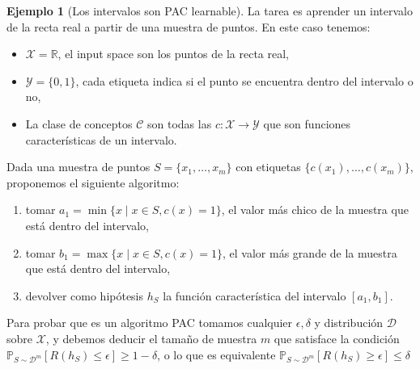 \documentclass{article}
\theoremstyle{definition}
\newtheorem{example}{Ejemplo}%
\begin{document}
\begin{example}[Los intervalos son PAC learnable] 

    La tarea es aprender un intervalo de la recta real a partir de una muestra de puntos. En este caso tenemos:
    \begin{itemize}
        \item $\mathcal{X} = \mathbb{R}$, el input space son los puntos de la recta real,
        \item $\mathcal{Y} = \{0, 1\}$, cada etiqueta indica si el punto se encuentra dentro del intervalo o no,
        \item La clase de conceptos $\mathcal{C}$ son todas las $c : \mathcal{X} \to \mathcal{Y}$ que son funciones caracter\'isticas de un intervalo.
    \end{itemize}

    Dada una muestra de puntos $S = \{x_1, \dots, x_m\}$ con etiquetas $\{c(x_1), \dots, c(x_m)\}$, proponemos el siguiente algoritmo: 
    \begin{enumerate}
        \item tomar $a_1 = \min \{x \mid x \in S, c(x) = 1\}$, el valor m\'as chico de la muestra que est\'a dentro del intervalo,
        \item tomar $b_1 = \max \{x \mid x \in S, c(x) = 1\}$, el valor m\'as grande de la muestra que est\'a dentro del intervalo,
        \item devolver como hip\'otesis $h_S$ la funci\'on caracter\'istica del intervalo $[a_1, b_1]$.
    \end{enumerate}

    Para probar que es un algoritmo PAC tomamos cualquier $\epsilon, \delta$ y distribuci\'on $\mathcal{D}$ sobre $\mathcal{X}$, y debemos deducir el tama\~no de muestra $m$ que satisface la condici\'on $\mathbb{P}_{S\sim\mathcal{D}^m}[R(h_S) \leq \epsilon] \geq 1 - \delta$, o lo que es equivalente $\mathbb{P}_{S\sim\mathcal{D}^m}[R(h_S) \geq \epsilon] \leq \delta$


\end{example}
\end{document}
